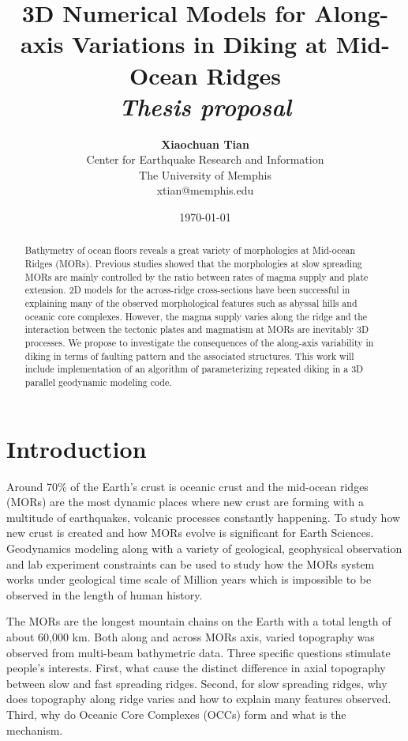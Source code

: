 \documentclass[12pt]{article}
\title{{\bf 3D Numerical Models for Along-axis Variations in Diking at Mid-Ocean Ridges} \\
\it Thesis proposal}
\author{ {\bf Xiaochuan Tian}  \\
Center for Earthquake Research and Information \\
The University of Memphis\\
{\small xtian@memphis.edu}
}
\date{\today}
\begin{document}
\pagestyle{plain}
\maketitle

\pagebreak
\begin{abstract}

Bathymetry of ocean floors reveals a great variety of morphologies at Mid-ocean Ridges (MORs). Previous studies showed that the morphologies at slow spreading MORs are mainly controlled by the ratio between rates of magma supply and plate extension. 2D models for the across-ridge cross-sections have been successful in explaining many of the observed morphological features such as abyssal hills and oceanic core complexes. However, the magma supply varies along the ridge and the interaction between the tectonic plates and magmatism at MORs are inevitably 3D processes. We propose to investigate the consequences of the along-axis variability in diking in terms of faulting pattern and the associated structures. This work will include implementation of an algorithm of parameterizing repeated diking in a 3D parallel geodynamic modeling code.

\end{abstract}

\pagebreak
\tableofcontents
\pagebreak

\cleardoublepage
{}

\section{Introduction}
\label{ch:intro}

Around 70\% of the Earth's crust is oceanic crust and the mid-ocean ridges (MORs) are the most dynamic places where new crust are forming with a multitude of earthquakes, volcanic processes constantly happening. To study how new crust is created and how MORs evolve is significant for Earth Sciences.  Geodynamics modeling along with a variety of geological, geophysical observation and lab experiment constraints can be used to study how the MORs system works under geological time scale of Million years which is impossible to be observed in the length of human history.

The MORs are the longest mountain chains on the Earth with a total length of about 60,000 km. Both along and across MORs axis, varied topography was observed from multi-beam bathymetric data. Three specific questions stimulate people's interests. First, what cause the distinct difference in axial topography between slow and fast spreading ridges. Second, for slow spreading ridges, why does topography  along ridge varies and how to explain many features observed. Third, why do Oceanic Core Complexes (OCCs) form and what is the mechanism. 
\end{document}
